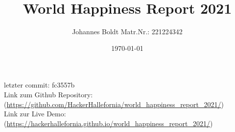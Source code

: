 \subject{Projektbericht zum Modul Information Retrieval und Visualisierung Sommersemester 2022}
\title{World Happiness Report 2021}
\author{Johannes Boldt Matr.Nr.: 221224342}%
\date{\today}
\maketitle%
\vspace{11cm}
\begin{centering}

\hline
\vspace{0.5cm}
letzter commit: fc3557b\\
Link zum Github Repository: \\
(\href{https://github.com/HackerHallefornia/world_happiness_report_2021}{https://github.com/HackerHallefornia/world\_happiness\_report\_2021/}) \\

Link zur Live Demo: \\
(\href{https://hackerhallefornia.github.io/world_happiness_report_2021/}{https://hackerhallefornia.github.io/world\_happiness\_report\_2021/})
    
\end{centering}
\clearpage

